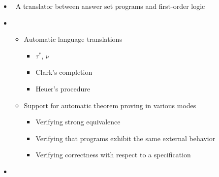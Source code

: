\begin{frame}{\anthem}
  \begin{itemize}
  \item {} \ A translator between answer set programs and first-order logic
  \item {}
    \begin{itemize}
      \item Automatic language translations
      \begin{itemize}
        \item $\tau^*$, $\nu$
        \item Clark's completion
        \item Heuer's procedure
      \end{itemize}
      \item Support for automatic theorem proving in various modes
      \begin{itemize}
        \item Verifying strong equivalence
        \item Verifying that programs exhibit the same external behavior
        \item Verifying correctness with respect to a specification
      \end{itemize}
    \end{itemize}
  \item {} \cite{lilusc19a, falilusc20a}
  \end{itemize}
\end{frame}
%
